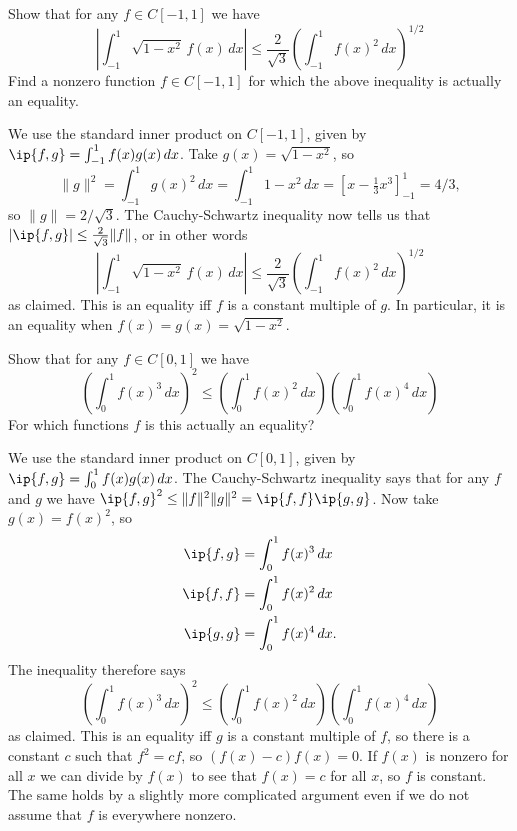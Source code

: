 \begin{exercise}\label{ex-cauchy-i}
 Show that for any $f\in C[-1,1]$ we have 
 \[ \left|\int_{-1}^1\sqrt{1-x^2}\,f(x)\,dx\right| \leq
     \frac{2}{\sqrt{3}} \left(\int_{-1}^1 f(x)^2\,dx\right)^{1/2} 
 \]
 Find a nonzero function $f\in C[-1,1]$ for which the above inequality
 is actually an equality.
\end{exercise}
\begin{solution}
 We use the standard inner product on $C[-1,1]$, given by
 $\ip{f,g}=\int_{-1}^1f(x)g(x)\,dx$.  Take
 $g(x)=\sqrt{1-x^2}$, so 
 \[ \|g\|^2=\int_{-1}^1g(x)^2\,dx=
     \int_{-1}^1 1-x^2\,dx =
     \left[x-\tfrac{1}{3}x^3\right]_{-1}^1 = 4/3,
 \]
 so $\|g\|=2/\sqrt{3}$.  The Cauchy-Schwartz inequality now
 tells us that $|\ip{f,g}|\leq\frac{2}{\sqrt{3}}\|f\|$, or
 in other words 
 \[ \left|\int_{-1}^1\sqrt{1-x^2}\,f(x)\,dx\right| \leq
     \frac{2}{\sqrt{3}} \left(\int_{-1}^1 f(x)^2\,dx\right)^{1/2} 
 \]
 as claimed.  This is an equality iff $f$ is a constant multiple of
 $g$.  In particular, it is an equality when
 $f(x)=g(x)=\sqrt{1-x^2}$. 
\end{solution}

\begin{exercise}\label{ex-cauchy-ii}
 Show that for any $f\in C[0,1]$ we have 
 \[ \left(\int_0^1 f(x)^3\,dx\right)^2 \leq 
     \left(\int_0^1 f(x)^2\,dx\right) 
     \left(\int_0^1 f(x)^4\,dx\right)
 \]
 For which functions $f$ is this actually an equality?
\end{exercise}
\begin{solution}
 We use the standard inner product on $C[0,1]$, given by
 $\ip{f,g}=\int_0^1f(x)g(x)\,dx$.  The Cauchy-Schwartz
 inequality says that for any $f$ and $g$ we have
 $\ip{f,g}^2\leq\|f\|^2\|g\|^2=\ip{f,f}\ip{g,g}$.  Now take
 $g(x)=f(x)^2$, so
 \begin{align*}
  \ip{f,g} &= \int_0^1 f(x)^3\,dx \\
  \ip{f,f} &= \int_0^1 f(x)^2\,dx \\
  \ip{g,g} &= \int_0^1 f(x)^4\,dx.
 \end{align*}
 The inequality therefore says
 \[\left(\int_0^1 f(x)^3\,dx\right)^2 \leq 
     \left(\int_0^1 f(x)^2\,dx\right) 
     \left(\int_0^1 f(x)^4\,dx\right)
 \] 
 as claimed.  This is an equality iff $g$ is a constant multiple of
 $f$, so there is a constant $c$ such that $f^2=cf$, so 
 $(f(x)-c)f(x)=0$.  If $f(x)$ is nonzero for all $x$ we can divide by
 $f(x)$ to see that $f(x)=c$ for all $x$, so $f$ is constant.  The
 same holds by a slightly more complicated argument even if we do not
 assume that $f$ is everywhere nonzero.
\end{solution}

